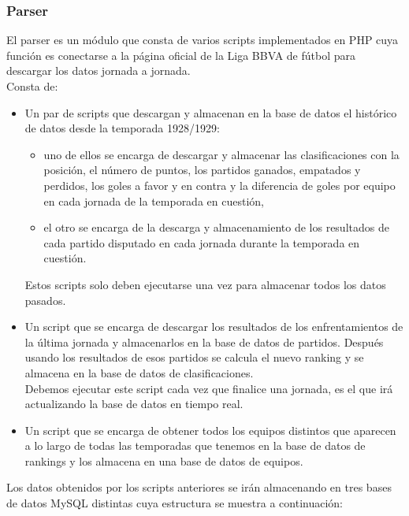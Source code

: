 \subsubsection{Parser}
El parser es un módulo que consta de varios scripts implementados en PHP cuya función es conectarse a la página oficial de la Liga BBVA de fútbol para descargar los datos jornada a jornada.\\

Consta de:
\begin{itemize}
	\item Un par de scripts que descargan y almacenan en la base de datos el histórico de datos desde la temporada 1928/1929: 
	\begin{itemize}
		\item uno de ellos se encarga de descargar y almacenar las clasificaciones con la posición, el número de puntos, los partidos ganados, empatados y perdidos, los goles a favor y en contra y la diferencia de goles por equipo en cada jornada de la temporada en cuestión,
		\item el otro se encarga de la descarga y almacenamiento de los resultados de cada partido disputado en cada jornada durante la temporada en cuestión. 
	\end{itemize}
	Estos scripts solo deben ejecutarse una vez para almacenar todos los datos pasados.
	\item Un script que se encarga de descargar los resultados de los enfrentamientos de la última jornada y almacenarlos en la base de datos de partidos. Después usando los resultados de esos partidos se calcula el nuevo ranking y se almacena en la base de datos de clasificaciones.\\
	Debemos ejecutar este script cada vez que finalice una jornada, es el que irá actualizando la base de datos en tiempo real.
	\item Un script que se encarga de obtener todos los equipos distintos que aparecen a lo largo de todas las temporadas que tenemos en la base de datos de rankings y los almacena en una base de datos de equipos.
\end{itemize}

\newpage

Los datos obtenidos por los scripts anteriores se irán almacenando en tres bases de datos MySQL distintas cuya estructura se muestra a continuación: 


